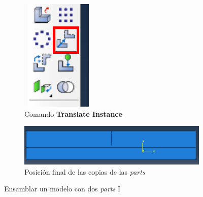 \begin{itemize}
\begin{figure}[!h]
    \begin{subfigure}[!h]{0.15\textwidth}
      \includegraphics[width=\textwidth]{./body/images/ayu02.pdf}
      \caption{Comando \textbf{Translate Instance}}
      \label{ayu02}
    \end{subfigure}%
    \begin{subfigure}[!h]{0.82\textwidth}
      \includegraphics[width=\textwidth]{./body/images/ayu03}
      \caption{Posición final de las copias de las \textit{parts}}
      \label{ayu03}
    \end{subfigure}%
    \caption{Ensamblar un modelo con dos \textit{parts} I}
  \end{figure}


\end{itemize}
